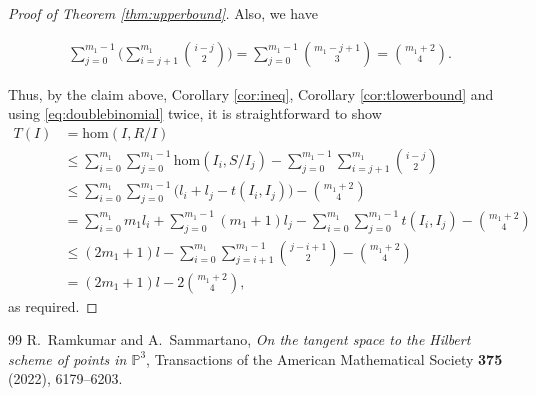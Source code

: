 \documentclass[10pt,a4paper]{amsart}
\begin{document}
\begin{proof}[Proof of Theorem \ref{thm:upperbound}]
Also, we have 

\begin{align}\label{eq:doublebinomial}
    \sum_{j=0}^{m_1-1}\Bigg(\sum_{i=j+1}^{m_1}\binom{i-j}{2}\Bigg)= \sum_{j=0}^{m_1-1}{m_1-j+1\choose 3}={m_1+2 \choose 4}.
\end{align}

Thus, by the claim above, Corollary \ref{cor:ineq}, Corollary  \ref{cor:tlowerbound} and using \eqref{eq:doublebinomial} twice, it is straightforward to show
\begin{align*}
    T(I)&=\mathrm{hom}(I,R/I)\\
    &\leq\sum_{i=0}^{m_1}\sum_{j=0}^{m_1-1}\mathrm{hom}(I_i,S/I_j)-\sum_{j=0}^{m_1-1}\sum_{i=j+1}^{m_1}\binom{i-j}{2}\\
    &\leq\sum_{i=0}^{m_1}\sum_{j=0}^{m_1-1}\big(l_i+l_j-t(I_i,I_j)\big)-\binom{m_1+2}{4}\\
    &=\sum_{i=0}^{m_1}m_1l_i+\sum_{j=0}^{m_1-1}(m_1+1)l_j-\sum_{i=0}^{m_1}\sum_{j=0}^{m_1-1}t(I_i,I_j)-\binom{m_1+2}{4}\\
    &\leq(2m_1+1)l-\sum_{i=0}^{m_1}\sum_{j=i+1}^{m_1-1}\binom{j-i+1}{2}-\binom{m_1+2}{4}\\
    &=(2m_1+1)l-2\binom{m_1+2}{4},
\end{align*}
as required.
\end{proof}

\begin{thebibliography}{99}
 R.~Ramkumar and A.~Sammartano, {\em {On the tangent space to the Hilbert scheme of points in $\mathbb{P}^3$}}, Transactions of the American Mathematical Society {\bf 375} (2022), 6179--6203.
\end{thebibliography}
\end{document}
